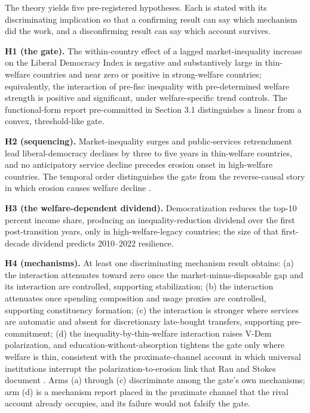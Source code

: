The theory yields five pre-registered hypotheses. Each is stated with its discriminating implication so that a confirming result can say which mechanism did the work, and a disconfirming result can say which account survives.

\textbf{H1 (the gate).} The within-country effect of a lagged market-inequality increase on the Liberal Democracy Index is negative and substantively large in thin-welfare countries and near zero or positive in strong-welfare countries; equivalently, the interaction of pre-fisc inequality with pre-determined welfare strength is positive and significant, under welfare-specific trend controls. The functional-form report pre-committed in Section 3.1 distinguishes a linear from a convex, threshold-like gate.

\textbf{H2 (sequencing).} Market-inequality surges and public-services retrenchment lead liberal-democracy declines by three to five years in thin-welfare countries, and no anticipatory service decline precedes erosion onset in high-welfare countries. The temporal order distinguishes the gate from the reverse-causal story in which erosion causes welfare decline \citep{SzikraOktem2023}.

\textbf{H3 (the welfare-dependent dividend).} Democratization reduces the top-10 percent income share, producing an inequality-reduction dividend over the first post-transition years, only in high-welfare-legacy countries; the size of that first-decade dividend predicts 2010--2022 resilience.

\textbf{H4 (mechanisms).} At least one discriminating mechanism result obtains: (a) the interaction attenuates toward zero once the market-minus-disposable gap and its interaction are controlled, supporting stabilization; (b) the interaction attenuates once spending composition and usage proxies are controlled, supporting constituency formation; (c) the interaction is stronger where services are automatic and absent for discretionary late-bought transfers, supporting pre-commitment; (d) the inequality-by-thin-welfare interaction raises V-Dem polarization, and education-without-absorption tightens the gate only where welfare is thin, consistent with the proximate-channel account in which universal institutions interrupt the polarization-to-erosion link that Rau and Stokes document \citep{RauStokes2025}. Arms (a) through (c) discriminate among the gate's own mechanisms; arm (d) is a mechanism report placed in the proximate channel that the rival account already occupies, and its failure would not falsify the gate.

